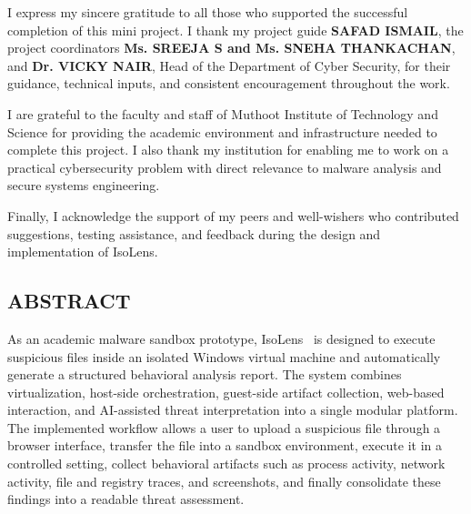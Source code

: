 \documentclass[a4paper,12pt,oneside]{report}
\begin{document}
\noindent
I express my sincere gratitude to all those who supported the successful completion of this mini project. I thank my project guide \textbf{SAFAD ISMAIL}, the project coordinators \textbf{Ms. SREEJA S and Ms. SNEHA THANKACHAN}, and \textbf{Dr. VICKY NAIR}, Head of the Department of Cyber Security, for their guidance, technical inputs, and consistent encouragement throughout the work.

\par

\par

I are grateful to the faculty and staff of Muthoot Institute of Technology and Science for providing the academic environment and infrastructure needed to complete this project. I also thank my institution for enabling me to work on a practical cybersecurity problem with direct relevance to malware analysis and secure systems engineering.

\par

\par

Finally, I acknowledge the support of my peers and well-wishers who contributed suggestions, testing assistance, and feedback during the design and implementation of IsoLens.

\newpage
{}
\setcounter{page}{2}
\thispagestyle{plain}
\begin{center}
\section*{ABSTRACT}
\end{center}
\par

As an academic malware sandbox prototype, IsoLens~\cite{isolens} is designed to execute suspicious files inside an isolated Windows virtual machine and automatically generate a structured behavioral analysis report. The system combines virtualization, host-side orchestration, guest-side artifact collection, web-based interaction, and AI-assisted threat interpretation into a single modular platform. The implemented workflow allows a user to upload a suspicious file through a browser interface, transfer the file into a sandbox environment, execute it in a controlled setting, collect behavioral artifacts such as process activity, network activity, file and registry traces, and screenshots, and finally consolidate these findings into a readable threat assessment.
\end{document}
